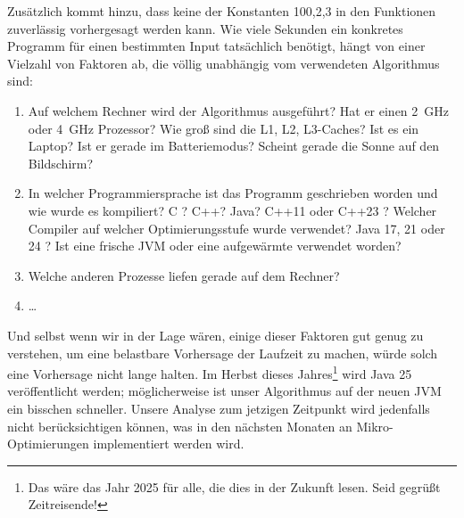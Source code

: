 \begin{remark}
    Zusätzlich kommt hinzu, dass keine der Konstanten 100,2,3 in den Funktionen zuverlässig vorhergesagt werden kann. Wie viele Sekunden ein konkretes Programm für einen bestimmten Input tatsächlich benötigt, hängt von einer Vielzahl von Faktoren ab, die völlig unabhängig vom verwendeten Algorithmus sind:
    \begin{enumerate}
        \item Auf welchem Rechner wird der Algorithmus ausgeführt? Hat er einen \SI{2}{\giga\hertz} oder \SI{4}{\giga\hertz} Prozessor? Wie groß sind die L1, L2, L3-Caches? Ist es ein Laptop? Ist er gerade im Batteriemodus? Scheint gerade die Sonne auf den Bildschirm?
        \item In welcher Programmiersprache ist das Programm geschrieben worden und wie wurde es kompiliert? C ? C++? Java? C++11 oder C++23 ? Welcher Compiler auf welcher Optimierungsstufe wurde verwendet? Java 17, 21 oder 24 ? Ist eine frische JVM oder eine aufgewärmte verwendet worden?
        \item Welche anderen Prozesse liefen gerade auf dem Rechner?
        \item \ldots
    \end{enumerate}
    Und selbst wenn wir in der Lage wären, einige dieser Faktoren gut genug zu verstehen, um eine belastbare Vorhersage der Laufzeit zu machen, würde solch eine Vorhersage nicht lange halten. Im Herbst dieses Jahres\footnote{Das wäre das Jahr 2025 für alle, die dies in der Zukunft lesen. Seid gegrüßt Zeitreisende!} wird Java 25 veröffentlicht werden; möglicherweise ist unser Algorithmus auf der neuen JVM ein bisschen schneller. Unsere Analyse zum jetzigen Zeitpunkt wird jedenfalls nicht berücksichtigen können, was in den nächsten Monaten an Mikro-Optimierungen implementiert werden wird.
\end{remark}

